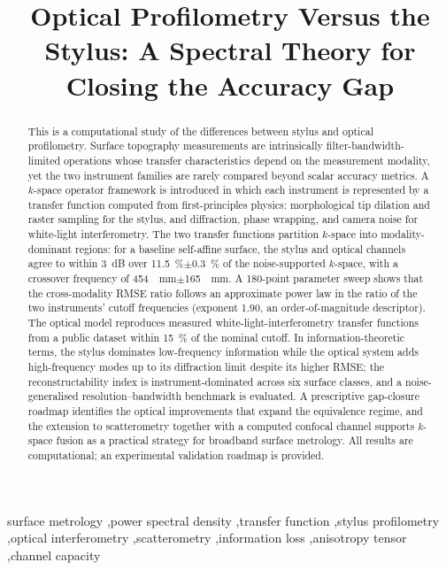 \documentclass[review,12pt]{elsarticle}
\begin{document}
\begin{frontmatter}

\title{Optical Profilometry Versus the Stylus: A Spectral Theory for Closing the Accuracy Gap}


\begin{abstract}
This is a computational study of the differences between stylus and optical profilometry. Surface topography measurements are intrinsically filter-bandwidth-limited operations whose transfer characteristics depend on the measurement modality, yet the two instrument families are rarely compared beyond scalar accuracy metrics. A $k$-space operator framework is introduced in which each instrument is represented by a transfer function computed from first-principles physics: morphological tip dilation and raster sampling for the stylus, and diffraction, phase wrapping, and camera noise for white-light interferometry. The two transfer functions partition $k$-space into modality-dominant regions: for a baseline self-affine surface, the stylus and optical channels agree to within \SI{3}{dB} over \SI{11.5}{\percent}$\pm$\SI{0.3}{\percent} of the noise-supported $k$-space, with a crossover frequency of \SI{454}{\per\milli\metre}$\pm$\SI{165}{\per\milli\metre}. A 180-point parameter sweep shows that the cross-modality RMSE ratio follows an approximate power law in the ratio of the two instruments' cutoff frequencies (exponent 1.90, an order-of-magnitude descriptor). The optical model reproduces measured white-light-interferometry transfer functions from a public dataset within \SI{15}{\percent} of the nominal cutoff. In information-theoretic terms, the stylus dominates low-frequency information while the optical system adds high-frequency modes up to its diffraction limit despite its higher RMSE; the reconstructability index is instrument-dominated across six surface classes, and a noise-generalised resolution--bandwidth benchmark is evaluated. A prescriptive gap-closure roadmap identifies the optical improvements that expand the equivalence regime, and the extension to scatterometry together with a computed confocal channel supports $k$-space fusion as a practical strategy for broadband surface metrology. All results are computational; an experimental validation roadmap is provided.
\end{abstract}

\begin{keyword}
surface metrology \sep power spectral density \sep transfer function \sep stylus profilometry \sep optical interferometry \sep scatterometry \sep information loss \sep anisotropy tensor \sep channel capacity
\end{keyword}

\end{frontmatter}
\end{document}
